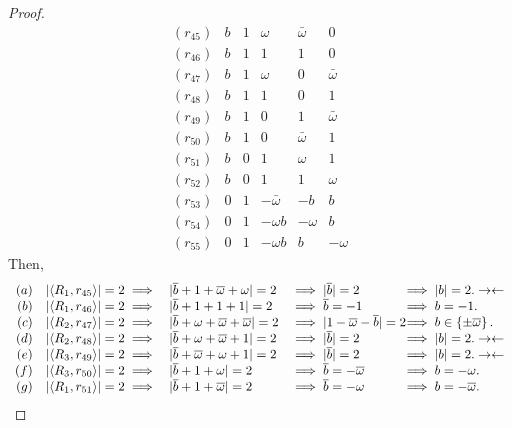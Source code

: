 \begin{lemma}
\begin{proof}
     $$
     \begin{array}{rccccc}
	(r_{45})  & b & 1         & \omega        & \bar{\omega}   & 0 \\
	(r_{46})  & b & 1         & 1         & 1         & 0 \\
	(r_{47})  & b & 1         & \omega        & 0         & \bar{\omega} \\
	(r_{48})  & b & 1         & 1         & 0         & 1 \\
	(r_{49})  & b & 1         & 0         & 1         & \bar{\omega} \\
	(r_{50})  & b & 1         & 0         & \bar{\omega}   & 1 \\
	(r_{51})  & b & 0         & 1         & \omega        & 1 \\
	(r_{52})  & b & 0         & 1         & 1         & \omega  \\
	(r_{53})  & 0 & 1         & -\bar{\omega}  & -b        & b \\
	(r_{54})  & 0 & 1         & -\omega b       & -\omega        & b \\
	(r_{55})  & 0 & 1         & -\omega b       & b         & -\omega
     \end{array}
     $$
Then,
     $$
     \begin{array}{rcll@{\hspace{-0.08cm}}l}
      (a) & \unb1{45} \implies & |\bar{b}+1+\bar{\omega}+\omega|=2       &\implies |\bar{b}|=2            &\implies |b| = 2.   \con \\
      (b) & \unb1{46} \implies & |\bar{b}+1+1+1|=2             &\implies \bar{b}=-1             &\implies b = -1.          \\
      (c) & \unb2{47} \implies & |\bar{b}+\omega+\bar{\omega}+\bar{\omega}|=2 &\implies |1-\bar{\omega}-\bar{b}|=2  &\implies b \in \left\{ \pm \bar{\omega}\right\}. \\
      (d) & \unb2{48} \implies & |\bar{b}+\omega+\bar{\omega}+1|=2       &\implies |\bar{b}|=2            &\implies |b| = 2.   \con \\
      (e) & \unb3{49} \implies & |\bar{b}+\bar{\omega}+\omega+1|=2       &\implies |\bar{b}|=2            &\implies |b| = 2.   \con \\
      (f) & \unb3{50} \implies & |\bar{b}+1+\omega|=2               &\implies \bar{b}=-\bar{\omega}       &\implies b = -\omega.          \\
      (g) & \unb1{51} \implies & |\bar{b}+1+\bar{\omega}|=2         &\implies \bar{b}=-\omega             &\implies b = -\bar{\omega}.    \\

\end{array}$$
\end{proof}
\end{lemma}
